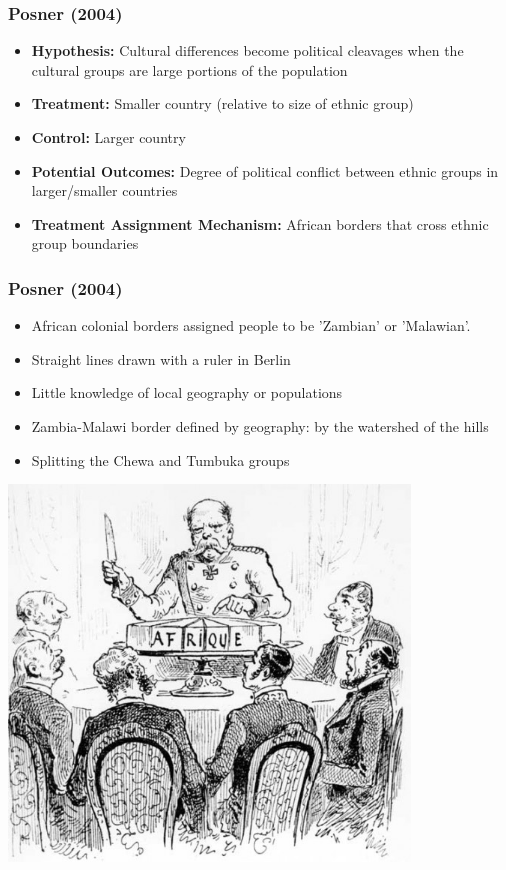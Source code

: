 \documentclass[xcolor=x11names,compress]{beamer}\usepackage[]{graphicx}\usepackage[]{color}
\renewcommand{\(}{\begin{columns}}
\renewcommand{\)}{\end{columns}}
\newcommand{\<}[1]{\begin{column}{#1}}
\renewcommand{\>}{\end{column}}
\begin{document}
\begin{frame}
\frametitle{Posner (2004)}
\begin{itemize}
\item \textbf{Hypothesis:} Cultural differences become political cleavages when the cultural groups are large portions of the population
\pause
\item \textbf{Treatment: } Smaller country (relative to size of ethnic group)
\pause
\item \textbf{Control: } Larger country
\pause
\item \textbf{Potential Outcomes:} Degree of political conflict between ethnic groups in larger/smaller countries
\pause
\item \textbf{Treatment Assignment Mechanism:} African borders that cross ethnic group boundaries
\end{itemize}
\end{frame}

\begin{frame}
\frametitle{Posner (2004)}
\begin{itemize}
\item African colonial borders assigned people to be 'Zambian' or 'Malawian'. 
\pause
\item Straight lines drawn with a ruler in Berlin
\pause
\item Little knowledge of local geography or populations
\pause
\item Zambia-Malawi border defined by geography: by the watershed of the hills
\pause
\item Splitting the Chewa and Tumbuka groups
\end{itemize}
\end{frame}

\begin{frame}
\includegraphics[width=0.8\textwidth]{Arbitrary_borders.jpg}
\end{frame}
\end{document}
